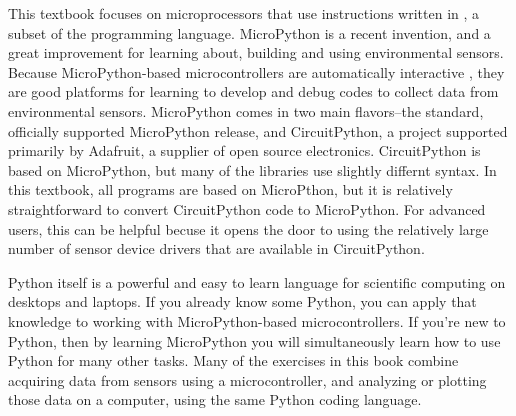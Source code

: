 This textbook focuses on microprocessors that use instructions written in , a subset of the  programming language.
MicroPython is a recent invention, and a great improvement for learning about, building and using environmental sensors.
Because MicroPython-based microcontrollers are automatically interactive
, they are good platforms for learning to develop and debug codes to collect data from environmental sensors.
MicroPython comes in two main flavors--the standard, officially supported MicroPython release, and CircuitPython, a project supported primarily by Adafruit, a supplier of open source electronics.
CircuitPython is based on MicroPython, but many of the libraries use slightly differnt syntax.
In this textbook, all programs are based on MicroPthon, but it is relatively straightforward to convert CircuitPython code to MicroPython.
For advanced users, this can be helpful becuse it opens the door to using the relatively large number of sensor device drivers that are available in CircuitPython.

Python itself is a powerful and easy to learn language for scientific computing on desktops and laptops.
If you already know some Python, you can apply that knowledge to working with MicroPython-based microcontrollers.
If you're new to Python, then by learning MicroPython you will simultaneously learn how to use Python for many other tasks.
Many of the exercises in this book combine acquiring data from sensors using a microcontroller, and analyzing or plotting those data on a computer, using the same Python coding language.

